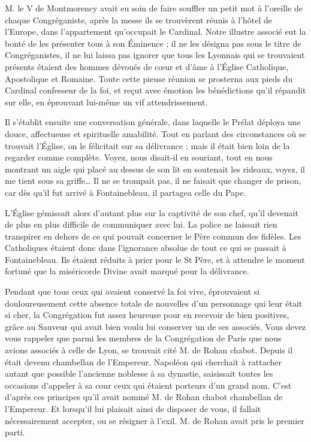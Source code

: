 M. le V de Montmorency avait eu soin de faire souffler un petit mot à l'oreille de chaque Congréganiste, après la messe ils se trouvèrent réunis à l'hôtel de l'Europe, dans l'appartement qu'occupait le Cardinal. Notre illustre associé eut
la bonté de les présenter tous à son Éminence ; il ne les désigna pas sous le titre de Congréganistes, il ne lui laissa pas ignorer que tous les Lyonnais qui se trouvaient présents étaient des hommes dévoués de cœur et d'âme à l'Église Catholique, Apostolique et Romaine. Toute cette pieuse réunion se prosterna aux pieds du Cardinal confesseur de la foi, et reçut avec émotion les bénédictions qu'il répandit sur elle, en éprouvant lui-même un vif attendrissement.

Il s'établit ensuite une conversation générale, dans laquelle le Prélat déploya une douce, affectueuse et spirituelle amabilité. Tout en parlant des circonstances où se trouvait l'Église, on le félicitait sur sa délivrance ; mais il était bien loin de la regarder comme complète. Voyez, nous disait-il en souriant, tout en nous montrant un aigle qui placé au dessus de son lit en soutenait les rideaux, voyez, il me tient sous sa griffe… Il ne se trompait pas, il ne faisait que changer de prison, car dès qu'il fut arrivé à Fontainebleau, il partagea celle du Pape.

L'Église gémissait alors d'autant plus sur la captivité de son chef, qu'il devenait de plus en plus difficile de communiquer avec lui. La police ne laissait rien transpirer en dehors de ce qui pouvait concerner le Père commun des fidèles. Les Catholiques étaient donc dans l'ignorance absolue de tout ce qui se passait à Fontainebleau. Ils étaient réduits à prier pour le St Père, et à attendre le moment fortuné que la miséricorde Divine avait marqué pour la délivrance.

Pendant que tous ceux qui avaient conservé la foi vive, éprouvaient si douloureusement cette absence totale de nouvelles d'un personnage qui leur était si cher, la Congrégation fut
assez heureuse pour en recevoir de bien positives, grâce au Sauveur qui avait bien voulu lui conserver un de ses associés. Vous devez vous rappeler que parmi les membres de la Congrégation de Paris que nous avions associés à celle de Lyon, se trouvait cité M. de Rohan chabot. Depuis il était devenu chambellan de l'Empereur. Napoléon qui cherchait à rattacher autant que possible l'ancienne noblesse à sa dynastie, saisissait toutes les occasions d'appeler à sa cour ceux qui étaient porteurs d'un grand nom. C'est d'après ces principes qu'il avait nommé M. de Rohan chabot chambellan de l'Empereur. Et lorsqu'il lui plaisait ainsi de disposer de vous, il fallait nécessairement accepter, ou se résigner à l'exil. M. de Rohan avait pris le premier parti.


